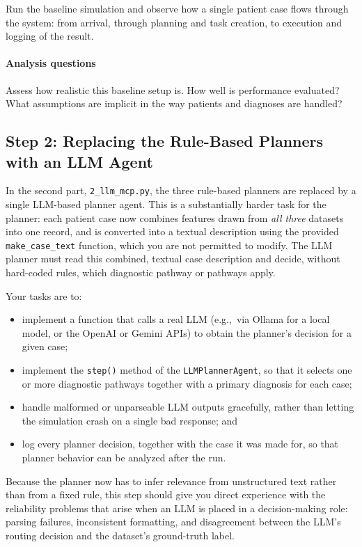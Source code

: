 Run the baseline simulation and observe how a single patient case flows through the system: from arrival, through planning and task creation, to execution and logging of the result.

\paragraph{Analysis questions} Assess how realistic this baseline setup is. How well is performance evaluated? What assumptions are implicit in the way patients and diagnoses are handled? 



\subsection[Step 2: Replacing Rule-Based Planners]{Step 2: Replacing the Rule-Based Planners with an LLM Agent}

In the second part, \texttt{2\_llm\_mcp.py}, the three rule-based planners are replaced by a single LLM-based planner agent. This is a substantially harder task for the planner: each patient case now combines features drawn from \emph{all three} datasets into one record, and is converted into a textual description using the provided \texttt{make\_case\_text} function, which you are not permitted to modify. The LLM planner must read this combined, textual case description and decide, without hard-coded rules, which diagnostic pathway or pathways apply.

Your tasks are to:
\begin{itemize}
    \item implement a function that calls a real LLM (e.g.,\ via Ollama for a local model, or the OpenAI or Gemini APIs) to obtain the planner's decision for a given case;
    \item implement the \texttt{step()} method of the \texttt{LLMPlannerAgent}, so that it selects one or more diagnostic pathways together with a primary diagnosis for each case;
    \item handle malformed or unparseable LLM outputs gracefully, rather than letting the simulation crash on a single bad response; and
    \item log every planner decision, together with the case it was made for, so that planner behavior can be analyzed after the run.
\end{itemize}
%
Because the planner now has to infer relevance from unstructured text rather than from a fixed rule, this step should give you direct experience with the reliability problems that arise when an LLM is placed in a decision-making role: parsing failures, inconsistent formatting, and disagreement between the LLM's routing decision and the dataset's ground-truth label.

